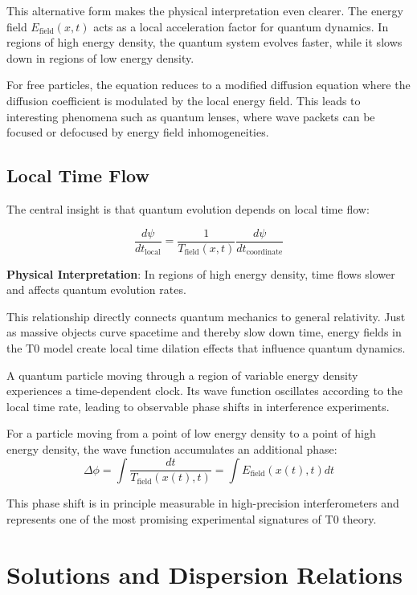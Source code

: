 \documentclass[12pt,a4paper]{article}
\theoremstyle{definition}
\theoremstyle{remark}
\begin{document}
	This alternative form makes the physical interpretation even clearer. The energy field $E_{\text{field}}(x,t)$ acts as a local acceleration factor for quantum dynamics. In regions of high energy density, the quantum system evolves faster, while it slows down in regions of low energy density.
	
	For free particles, the equation reduces to a modified diffusion equation where the diffusion coefficient is modulated by the local energy field. This leads to interesting phenomena such as quantum lenses, where wave packets can be focused or defocused by energy field inhomogeneities.
	
	\subsection{Local Time Flow}
	
	The central insight is that quantum evolution depends on local time flow:
	
	\begin{equation}
		\frac{d\psi}{dt_{\text{local}}} = \frac{1}{T_{\text{field}}(x,t)} \frac{d\psi}{dt_{\text{coordinate}}}
		\label{eq:local_time_flow}
	\end{equation}
	
	\textbf{Physical Interpretation}: In regions of high energy density, time flows slower and affects quantum evolution rates.
	
	This relationship directly connects quantum mechanics to general relativity. Just as massive objects curve spacetime and thereby slow down time, energy fields in the T0 model create local time dilation effects that influence quantum dynamics.
	
	A quantum particle moving through a region of variable energy density experiences a time-dependent clock. Its wave function oscillates according to the local time rate, leading to observable phase shifts in interference experiments.
	
	For a particle moving from a point of low energy density to a point of high energy density, the wave function accumulates an additional phase:
	$$\Delta \phi = \int \frac{dt}{T_{\text{field}}(x(t), t)} = \int E_{\text{field}}(x(t), t) dt$$
	
	This phase shift is in principle measurable in high-precision interferometers and represents one of the most promising experimental signatures of T0 theory.
	
	\section{Solutions and Dispersion Relations}
	
\end{document}
